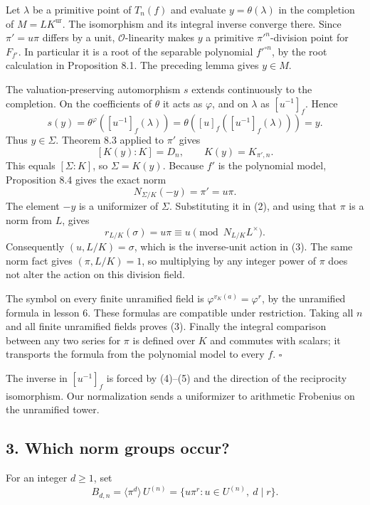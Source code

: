 \documentclass[11pt,a4paper]{article}
\begin{document}
Let \(\lambda\) be a primitive point of \(T_n(f)\) and evaluate
\(y=\theta(\lambda)\) in the completion of \(M=LK^{\mathrm{ur}}\). The
isomorphism and its integral inverse converge there. Since \(\pi'=u\pi\)
differs by a unit, \(\mathcal O\)-linearity makes \(y\) a primitive
\(\pi'^n\)-division point for \(F_{f'}\). In particular it is a root of
the separable polynomial \(f'^{\circ n}\), by the root calculation in
Proposition 8.1. The preceding lemma gives \(y\in M\).

The valuation-preserving automorphism \(s\) extends continuously to the
completion. On the coefficients of \(\theta\) it acts as \(\varphi\),
and on \(\lambda\) as \([u^{-1}]_f\). Hence \[
s(y)=\theta^\varphi([u^{-1}]_f(\lambda))
     =\theta([u]_f([u^{-1}]_f(\lambda)))=y.
\tag{5}
\] Thus \(y\in\Sigma\). Theorem 8.3 applied to \(\pi'\) gives \[
[K(y):K]=D_n,\qquad K(y)=K_{\pi',n}.
\] This equals \([\Sigma:K]\), so \(\Sigma=K(y)\). Because \(f'\) is the
polynomial model, Proposition 8.4 gives the exact norm \[
N_{\Sigma/K}(-y)=\pi'=u\pi.
\tag{6}
\] The element \(-y\) is a uniformizer of \(\Sigma\). Substituting it in
(2), and using that \(\pi\) is a norm from \(L\), gives \[
r_{L/K}(\sigma)=u\pi\equiv u\pmod{N_{L/K}L^\times}.
\] Consequently \((u,L/K)=\sigma\), which is the inverse-unit action in
(3). The same norm fact gives \((\pi,L/K)=1\), so multiplying by any
integer power of \(\pi\) does not alter the action on this division
field.

The symbol on every finite unramified field is
\(\varphi^{v_K(a)}=\varphi^r\), by the unramified formula in lesson 6.
These formulas are compatible under restriction. Taking all \(n\) and
all finite unramified fields proves (3). Finally the integral comparison
between any two series for \(\pi\) is defined over \(K\) and commutes
with scalars; it transports the formula from the polynomial model to
every \(f\). \(\square\)

The inverse in \([u^{-1}]_f\) is forced by (4)--(5) and the direction of
the reciprocity isomorphism. Our normalization sends a uniformizer to
arithmetic Frobenius on the unramified tower.

\subsection{3. Which norm groups occur?}\label{which-norm-groups-occur}

For an integer \(d\geq1\), set \[
B_{d,n}=\langle\pi^d\rangle\,U^{(n)}
       =\{u\pi^r:u\in U^{(n)},\ d\mid r\}.
\tag{7}
\]
\end{document}
